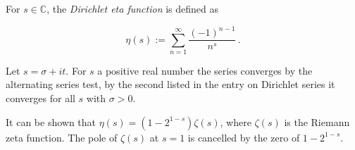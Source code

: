 \documentclass[12pt]{article}
\begin{document}
For $s\in\mathbb{C}$, the \emph{Dirichlet eta function} is defined as

\begin{equation}
\eta(s) := \sum_{n=1}^{\infty} \frac{\left( -1 \right)^{n-1}}{n^{s}}\,.
\end{equation}

Let  $s=\sigma + it$.  For $s$ a positive real number  the series converges by the alternating series test, by the second  listed in the entry on   Dirichlet series it converges for all $s$ with $\sigma > 0$.

It can be shown that $\eta(s) = (1-2^{1-s})\zeta(s)$, where $\zeta(s)$ is the Riemann zeta function. The pole of $\zeta(s)$ at $s=1$ is cancelled by the zero
of $1-2^{1-s}$. 
\end{document}
